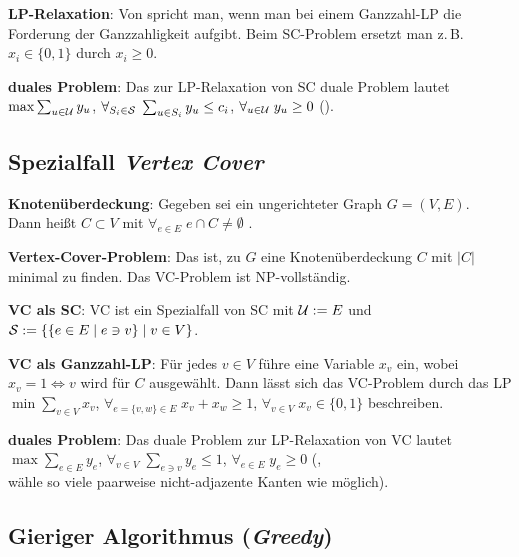 \textbf{LP-Relaxation}:
Von  spricht man, wenn man bei einem Ganzzahl-LP die Forderung
der Ganzzahligkeit aufgibt.
Beim SC-Problem ersetzt man z.\,B. $x_i \in \{0, 1\}$ durch $x_i \ge 0$.

\textbf{duales Problem}:
Das zur LP-Relaxation von SC duale Problem lautet\\
$\max \sum_{u \in \U} y_u$, $\forall_{S_i \in \S}\; \sum_{u \in S_i} y_u \le c_i$,
$\forall_{u \in \U}\; y_u \ge 0$ ().

\subsection{%
    Spezialfall \emph{Vertex Cover}%
}

\textbf{Knotenüberdeckung}:
Gegeben sei ein ungerichteter Graph $G = (V, E)$.\\
Dann heißt $C \subset V$ mit $\forall_{e \in E}\; e \cap C \not= \emptyset$
.

\textbf{Vertex-Cover-Problem}:
Das  ist, zu $G$ eine Knotenüberdeckung $C$ mit $|C|$ minimal
zu finden.
Das VC-Problem ist NP-vollständig.

\textbf{VC als SC}:
VC ist ein Spezialfall von SC mit $\U := E$ und
$\S := \{\{e \in E \;|\; e \ni v\} \;|\; v \in V\}$.

\linie

\textbf{VC als Ganzzahl-LP}:
Für jedes $v \in V$ führe eine Variable $x_v$ ein, wobei $x_v = 1 \iff v$ wird für $C$
ausgewählt.
Dann lässt sich das VC-Problem durch das LP\\
$\min \sum_{v \in V} x_v$, $\forall_{e = \{v, w\} \in E}\; x_v + x_w \ge 1$,
$\forall_{v \in V}\; x_v \in \{0, 1\}$
beschreiben.

\textbf{duales Problem}:
Das duale Problem zur LP-Relaxation von VC lautet\\
$\max \sum_{e \in E} y_e$, $\forall_{v \in V}\; \sum_{e \ni v} y_e \le 1$,
$\forall_{e \in E}\; y_e \ge 0$ (,\\
wähle so viele paarweise nicht-adjazente Kanten wie möglich).

\pagebreak

\subsection{%
    Gieriger Algorithmus (\emph{Greedy})%
}

